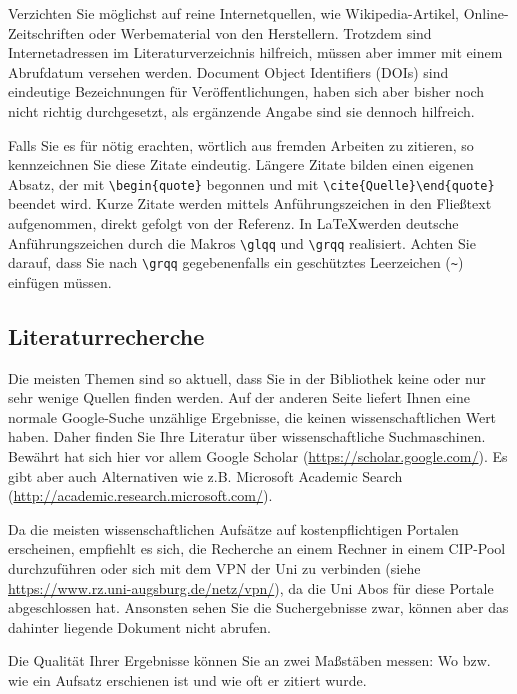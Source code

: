\documentclass[final,bibliography=totocnumbered]{include/sikseminar}
\begin{document}
Verzichten Sie möglichst auf reine Internetquellen, wie Wikipedia-Artikel, Online-Zeitschriften oder Werbematerial von den Herstellern. Trotzdem sind Internetadressen im Literaturverzeichnis hilfreich, müssen aber immer mit einem Abrufdatum versehen werden. Document Object Identifiers (DOIs) sind eindeutige Bezeichnungen für Veröffentlichungen, haben sich aber bisher noch nicht richtig durchgesetzt, als ergänzende Angabe sind sie dennoch hilfreich.

Falls Sie es für nötig erachten, wörtlich aus fremden Arbeiten zu zitieren, so kennzeichnen Sie diese Zitate eindeutig. Längere Zitate bilden einen eigenen Absatz, der mit \verb+\begin{quote}+ begonnen und mit \verb+\cite{Quelle}\end{quote}+ beendet wird. Kurze Zitate werden mittels Anführungszeichen in den Fließtext aufgenommen, direkt gefolgt von der Referenz. In \LaTeX werden deutsche Anführungszeichen durch die Makros \verb+\glqq+ und \verb+\grqq+ realisiert. Achten Sie darauf, dass Sie nach \verb+\grqq+ gegebenenfalls ein geschütztes Leerzeichen (\verb+~+) einfügen müssen.


\subsection{Literaturrecherche}
Die meisten Themen sind so aktuell, dass Sie in der Bibliothek keine oder nur sehr wenige Quellen finden werden. Auf der anderen Seite liefert Ihnen eine normale Google-Suche unzählige Ergebnisse, die keinen wissenschaftlichen Wert haben. Daher finden Sie Ihre Literatur über wissenschaftliche Suchmaschinen. Bewährt hat sich hier vor allem Google Scholar (\url{https://scholar.google.com/}). Es gibt aber auch Alternativen wie z.B. Microsoft Academic Search (\url{http://academic.research.microsoft.com/}).

Da die meisten wissenschaftlichen Aufsätze auf kostenpflichtigen Portalen erscheinen, empfiehlt es sich, die Recherche an einem Rechner in einem CIP-Pool durchzuführen oder sich mit dem VPN der Uni zu verbinden (siehe \url{https://www.rz.uni-augsburg.de/netz/vpn/}), da die Uni Abos für diese Portale abgeschlossen hat. Ansonsten sehen Sie die Suchergebnisse zwar, können aber das dahinter liegende Dokument nicht abrufen.

Die Qualität Ihrer Ergebnisse können Sie an zwei Maßstäben messen: Wo bzw. wie ein Aufsatz erschienen ist und wie oft er zitiert wurde.
\end{document}
